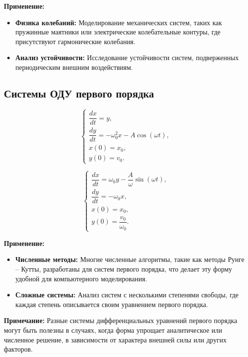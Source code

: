 \documentclass[12pt,a4paper]{article}
\begin{document}
\textbf{Применение:}
\begin{itemize}
    \item \textbf{Физика колебаний:} Моделирование механических систем, таких как пружинные маятники или электрические колебательные контуры, где присутствуют гармонические колебания.
    \item \textbf{Анализ устойчивости:} Исследование устойчивости систем, подверженных периодическим внешним воздействиям.
\end{itemize}

\subsection{Системы ОДУ первого порядка}
\begin{equation}
\begin{cases}
\dfrac{dx}{dt} = y, \\
\dfrac{dy}{dt} = -\omega_0^2 x - A\cos(\omega t), \\
x(0) = x_0, \\
y(0) = v_0.
\end{cases}
\end{equation}

\begin{equation}
\begin{cases}
\dfrac{dx}{dt} = \omega_0 y - \dfrac{A}{\omega}\sin(\omega t), \\
\dfrac{dy}{dt} = -\omega_0 x, \\
x(0) = x_0, \\
y(0) = \dfrac{v_0}{\omega_0}.
\end{cases}
\end{equation}

\textbf{Применение:}
\begin{itemize}
    \item \textbf{Численные методы:} Многие численные алгоритмы, такие как методы Рунге -- Кутты, разработаны для систем первого порядка, что делает эту форму удобной для компьютерного моделирования.
    \item \textbf{Сложные системы:} Анализ систем с несколькими степенями свободы, где каждая степень описывается своим уравнением первого порядка.
\end{itemize}

\textbf{Примечание:}
Разные системы дифференциальных уравнений первого порядка могут быть полезны в случаях, когда форма упрощает аналитическое или численное решение, в зависимости от характера внешней силы или других факторов.
\end{document}
